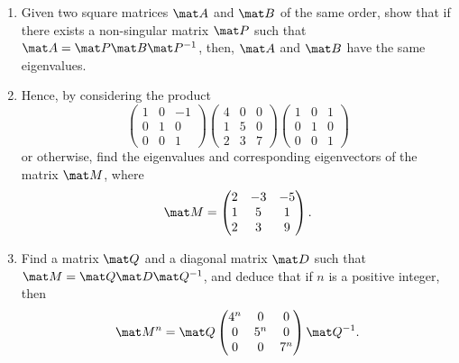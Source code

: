 \begin{problem}
    \begin{enumerate}
        \item Given two square matrices $\mat A$ and $\mat B$ of the same order, show that if there exists a non-singular matrix $\mat P$ such that $\mat A = \mat P \mat B \mat P^{-1}$, then, $\mat A$ and $\mat B$ have the same eigenvalues.
        \item Hence, by considering the product \[\begin{pmatrix}1 & 0 & -1 \\ 0 & 1 & 0 \\ 0 & 0 & 1\end{pmatrix} \begin{pmatrix}4 & 0 & 0 \\ 1 & 5 & 0 \\ 2 & 3 & 7\end{pmatrix} \begin{pmatrix}1 & 0 & 1 \\ 0 & 1 & 0 \\ 0 & 0 & 1\end{pmatrix}\] or otherwise, find the eigenvalues and corresponding eigenvectors of the matrix $\mat M$, where \[\mat M = \begin{pmatrix}2 & -3 & -5 \\ 1 & 5 & 1 \\ 2 & 3 & 9\end{pmatrix}.\]
        \item Find a matrix $\mat Q$ and a diagonal matrix $\mat D$ such that $\mat M = \mat Q \mat D \mat Q^{-1}$, and deduce that if $n$ is a positive integer, then \[\mat M^n = \mat Q \begin{pmatrix}4^n & 0 & 0 \\ 0 & 5^n & 0 \\ 0 & 0 & 7^n\end{pmatrix} \mat Q^{-1}.\]
    \end{enumerate}
\end{problem}
